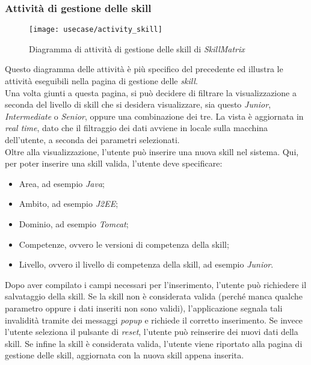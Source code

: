 \subsubsection{Attività di gestione delle skill}
\begin{figure}[!h] 
    \centering 
    \texttt{[image: usecase/activity\_skill]} 
    \caption{Diagramma di attività di gestione delle skill di \emph{SkillMatrix}}
\end{figure}
Questo diagramma delle attività è più specifico del precedente ed illustra le attività eseguibili nella pagina di gestione delle \emph{skill}.\\
Una volta giunti a questa pagina, si può decidere di filtrare la visualizzazione a seconda del livello di skill che si desidera visualizzare, sia questo \emph{Junior}, \emph{Intermediate} o \emph{Senior}, oppure una combinazione dei tre. La vista è aggiornata in \emph{real time}, dato che il filtraggio dei dati avviene in locale sulla macchina dell'utente, a seconda dei parametri selezionati.\\
Oltre alla visualizzazione, l'utente può inserire una nuova skill nel sistema. Qui, per poter inserire una skill valida, l'utente deve specificare:
\begin{itemize}
	\item Area, ad esempio \emph{Java};
	\item Ambito, ad esempio \emph{J2EE};
	\item Dominio, ad esempio \emph{Tomcat};
	\item Competenze, ovvero le versioni di competenza della skill;
	\item Livello, ovvero il livello di competenza della skill, ad esempio \emph{Junior}.
\end{itemize}
Dopo aver compilato i campi necessari per l'inserimento, l'utente può richiedere il salvataggio della skill. Se la skill non è considerata valida (perché manca qualche parametro oppure i dati inseriti non sono validi), l'applicazione segnala tali invalidità tramite dei messaggi \emph{popup} e richiede il corretto inserimento. Se invece l'utente seleziona il pulsante di \emph{reset}, l'utente può reinserire dei nuovi dati della skill. Se infine la skill è considerata valida, l'utente viene riportato alla pagina di gestione delle skill, aggiornata con la nuova skill appena inserita.